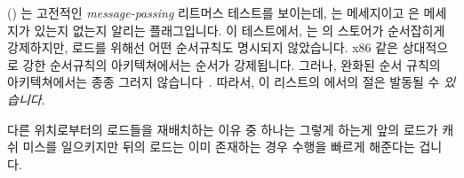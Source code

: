 \begin{fcvref}
()
는 고전적인 \emph{message-passing} 리트머스 테스트를 보이는데,  는
메세지이고  은 메세지가 있는지 없는지 알리는 플래그입니다.
이 테스트에서,  는  의 스토어가 순서잡히게 강제하지만,
로드를 위해선 어떤 순서규칙도 명시되지 않았습니다.
x86 같은 상대적으로 강한 순서규칙의 아키텍쳐에서는 순서가 강제됩니다.
그러나, 완화된 순서 규칙의 아키텍쳐에서는 종종 그러지
않습니다~\cite{JadeAlglave2011ppcmem}.
따라서, 이 리스트의  에서의  절은 발동될 수
\emph{있습니다}.
\end{fcvref}

다른 위치로부터의 로드들을 재배치하는 이유 중 하나는 그렇게 하는게 앞의 로드가
캐쉬 미스를 일으키지만 뒤의 로드는 이미 존재하는 경우 수행을 빠르게 해준다는
겁니다.

